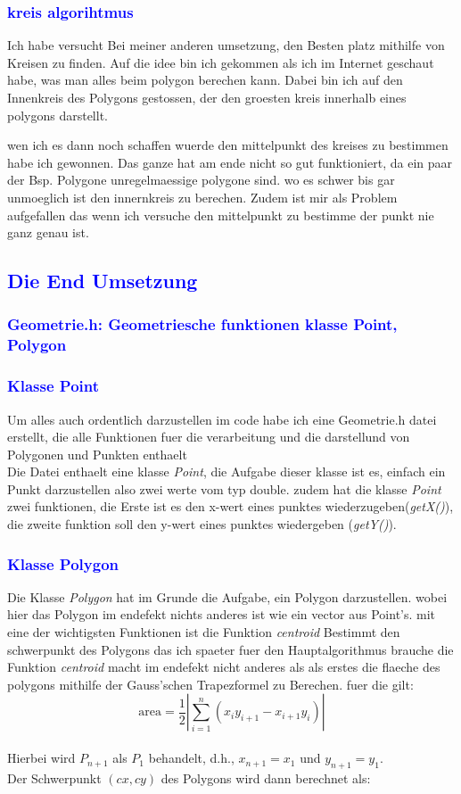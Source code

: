 \documentclass{article}
\begin{document}
\subsubsection{\textcolor{blue}{kreis algorihtmus}}
Ich habe versucht Bei meiner anderen umsetzung, den Besten platz mithilfe von Kreisen zu finden. Auf die idee bin ich gekommen als ich im Internet geschaut habe, was man alles beim polygon berechen kann. Dabei bin ich auf den Innenkreis des Polygons gestossen, der den groesten kreis innerhalb eines polygons darstellt.
\par\medskip
 wen ich es dann noch schaffen wuerde den mittelpunkt des kreises zu bestimmen habe ich gewonnen. Das ganze hat am ende nicht so gut funktioniert, da ein paar der Bsp. Polygone unregelmaessige polygone sind. wo es schwer bis gar unmoeglich ist den innernkreis zu berechen. Zudem ist mir als Problem aufgefallen das wenn ich versuche den mittelpunkt zu bestimme der punkt nie ganz genau ist.
\subsection{\textcolor{blue}{Die End Umsetzung}}
\subsubsection{\textcolor{blue}{Geometrie.h: Geometriesche funktionen klasse Point, Polygon}}
\subsubsection{\textcolor{blue}{Klasse Point}}
Um alles auch ordentlich darzustellen im code habe ich eine Geometrie.h datei erstellt, die alle Funktionen fuer die verarbeitung und die darstellund von Polygonen und Punkten enthaelt
\\
Die Datei enthaelt eine klasse \textit{Point}, die Aufgabe dieser klasse ist es, einfach ein Punkt darzustellen also zwei werte vom typ double. zudem hat die klasse \textit{Point} zwei funktionen, die Erste ist es den x-wert eines punktes wiederzugeben(\textit{getX()}), die zweite funktion soll den y-wert eines punktes wiedergeben (\textit{getY()}).  
\subsubsection{\textcolor{blue}{Klasse Polygon}}
Die Klasse \textit{Polygon} hat im Grunde die Aufgabe, ein Polygon darzustellen. wobei hier das Polygon im endefekt nichts anderes ist wie ein vector aus Point's. mit eine der wichtigsten Funktionen ist die Funktion \textit{centroid} Bestimmt den schwerpunkt des Polygons das ich spaeter fuer den Hauptalgorithmus brauche die Funktion \textit{centroid} macht im endefekt nicht anderes als als erstes die flaeche des polygons mithilfe der Gauss'schen Trapezformel zu Berechen. fuer die gilt:
\[
\text{area} = \frac{1}{2} \left| \sum_{i=1}^{n} (x_i y_{i+1} - x_{i+1} y_i) \right|
\]
\\
Hierbei wird $P_{n+1}$ als $P_1$ behandelt, d.h., $x_{n+1} = x_1$ und $y_{n+1} = y_1$.
\\
Der Schwerpunkt $(cx, cy)$ des Polygons wird dann berechnet als:
\end{document}
